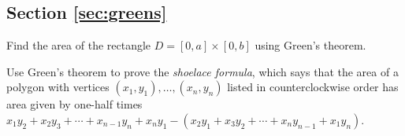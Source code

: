 \documentclass[svgnames]{watsonbook}
\begin{document}
\subsection*{Section \ref{sec:greens}}

\begin{exercise}{}{}
  Find the area of the rectangle $D=[0,a]\times[0,b]$ using Green's
  theorem.
\end{exercise}

\begin{exercise}{}{}
Use Green's theorem to prove the \textit{shoelace
  formula}, which says that the area of a polygon with vertices
$(x_1,y_1),\ldots,(x_n,y_n)$ listed in counterclockwise order has area
given by one-half times
$x_1y_2 + x_2 y_3 + \cdots + x_{n-1}y_n + x_n y_1 - (x_2 y_1 + x_3 y_2
+ \cdots + x_{n}y_{n-1}+ x_1 y_n)$.
\end{exercise}
\end{document}
